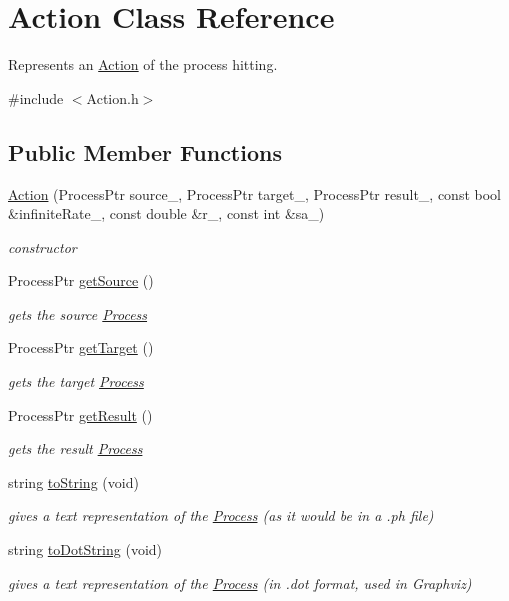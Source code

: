 \hypertarget{class_action}{\section{\-Action \-Class \-Reference}
\label{class_action}
}


\-Represents an \hyperlink{class_action}{\-Action} of the process hitting.  




{\ttfamily \#include $<$\-Action.\-h$>$}

\subsection*{\-Public \-Member \-Functions}
\begin{DoxyCompactItemize}
\item 
\hyperlink{class_action_a813d7e506bed06d58988b8efa46371c7}{\-Action} (\-Process\-Ptr source\-\_\-, \-Process\-Ptr target\-\_\-, \-Process\-Ptr result\-\_\-, const bool \&infinite\-Rate\-\_\-, const double \&r\-\_\-, const int \&sa\-\_\-)
\begin{DoxyCompactList}\small\item\em constructor \end{DoxyCompactList}\item 
\-Process\-Ptr \hyperlink{class_action_a19ce83cb05f0823e2426549108b29c55}{get\-Source} ()
\begin{DoxyCompactList}\small\item\em gets the source \hyperlink{class_process}{\-Process} \end{DoxyCompactList}\item 
\-Process\-Ptr \hyperlink{class_action_a1a6bbe7a883a55d0c446ec5e23ae36d6}{get\-Target} ()
\begin{DoxyCompactList}\small\item\em gets the target \hyperlink{class_process}{\-Process} \end{DoxyCompactList}\item 
\-Process\-Ptr \hyperlink{class_action_ad2f1969b3f50dd235000c6788a978ba0}{get\-Result} ()
\begin{DoxyCompactList}\small\item\em gets the result \hyperlink{class_process}{\-Process} \end{DoxyCompactList}\item 
string \hyperlink{class_action_a0dfc2e29fbaca7c75d60fd3cd8582052}{to\-String} (void)
\begin{DoxyCompactList}\small\item\em gives a text representation of the \hyperlink{class_process}{\-Process} (as it would be in a .ph file) \end{DoxyCompactList}\item 
string \hyperlink{class_action_aa38afb2bcdc765b8e905a8c0af68b7a8}{to\-Dot\-String} (void)
\begin{DoxyCompactList}\small\item\em gives a text representation of the \hyperlink{class_process}{\-Process} (in .dot format, used in \-Graphviz) \end{DoxyCompactList}\end{DoxyCompactItemize}
